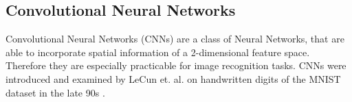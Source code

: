 
\subsection{Convolutional Neural Networks}\label{sec:prev_nn_cnn}
Convolutional Neural Networks (CNNs) are a class of Neural Networks, that are able to incorporate spatial information of a 2-dimensional feature space. Therefore they are especially practicable for image recognition tasks. 
CNNs were introduced and examined by LeCun et. al. on handwritten digits of the MNIST dataset in the late 90s
\cite{LeCun1998}.
